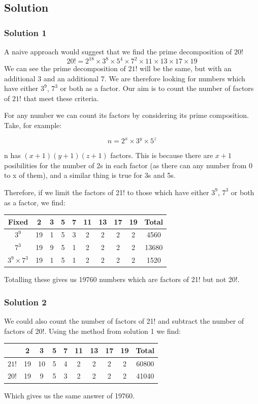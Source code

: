 \documentclass{article}
\begin{document}
\subsection{Solution}
\subsubsection{Solution 1}
A naive approach would suggest that we find the prime decomposition of \(20!\)
\begin{equation*}
  20!=2^{18} \times 3^8 \times 5^4 \times 7^2 \times 11 \times 13 \times 17 \times 19
\end{equation*}
We can see the prime decomposition of \(21!\) will be the same, but with an additional \(3\) and an additional \(7\). We are therefore looking for numbers which have either \(3^9\), \(7^3\) or both as a factor. Our aim is to count the number of factors of \(21!\) that meet these criteria.

For any number we can count its factors by considering its prime composition. Take, for example:

\begin{equation*}
  n=2^x \times 3^y \times 5^z
\end{equation*}

n has \((x+1)(y+1)(z+1)\) factors. This is because there are \(x+1\) posibilities for the number of 2s in each factor (as there can any number from 0 to x of them), and a similar thing is true for 3s and 5s.

Therefore, if we limit the factors of 21! to those which have either \(3^9\), \(7^3\) or both as a factor, we find:
\begin{center}
\begin{tabular}{ |c|c|c|c|c|c|c|c|c|c| }
\hline
Fixed & 2 & 3 & 5 & 7 & 11 & 13 & 17 & 19 & Total \\
\hline
\(3^9\) & 19 & 1 & 5 & 3 & 2 & 2 & 2 & 2 & 4560\\
\(7^3\) & 19 & 9 & 5 & 1 & 2 & 2 & 2 & 2 & 13680\\
\(3^9 \times 7^3\) & 19 & 1 & 5 & 1 & 2 & 2 & 2 & 2 & 1520\\
\hline
\end{tabular}
\end{center}
Totalling these gives us 19760 numbers which are factors of 21! but not 20!.

\subsubsection{Solution 2}
We could also count the number of factors of 21! and subtract the number of factors of 20!. Using the method from solution 1 we find:
\begin{center}
\begin{tabular}{ |c|c|c|c|c|c|c|c|c|c| }
\hline
 & 2 & 3 & 5 & 7 & 11 & 13 & 17 & 19 & Total \\
\hline
\(21!\) & 19 & 10 & 5 & 4 & 2 & 2 & 2 & 2 & 60800\\
\(20!\) & 19 & 9 & 5 & 3 & 2 & 2 & 2 & 2 & 41040\\
\hline
\end{tabular}
\end{center}
Which gives us the same answer of 19760.
\end{document}
